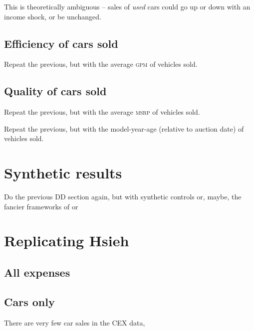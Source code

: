 \documentclass[11pt,letterpaper,oneside]{article}
\newcommand{\gpm}{\textsc{gpm}}
\newcommand{\msrp}{\textsc{msrp}}
\begin{document}
This is theoretically ambiguous -- sales of \emph{used} cars could go up or down with an income shock, or be unchanged.

\subsection{Efficiency of cars sold}
Repeat the previous, but with the average \gpm{} of vehicles sold.

\subsection{Quality of cars sold}
Repeat the previous, but with the average \msrp{} of vehicles sold.

Repeat the previous, but with the model-year-age (relative to auction date) of vehicles sold.


\section{Synthetic results}
Do the previous DD section again, but with synthetic controls or, maybe, the fancier frameworks of
\textcite{DoudchenkoImbens2016DD} or \textcite{Xu2016}




\section{Replicating Hsieh}

\subsection{All expenses}
\subsection{Cars only}

There are very few car sales in the CEX data,





\pagebreak
\printbibliography
\end{document}
